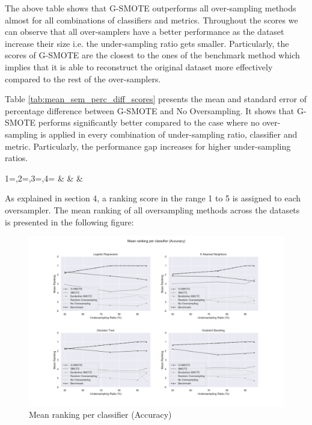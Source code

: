 \documentclass[parskip=full]{scrartcl}
\begin{document}
The above table shows that G-SMOTE outperforms all over-sampling methods almost
for all combinations of classifiers and metrics. Throughout the scores we can
observe that all over-samplers have a better performance as the dataset increase
their size i.e. the under-sampling ratio gets smaller.  Particularly, the scores
of G-SMOTE are the closest to the ones of the benchmark method which implies
that it is able to reconstruct the original dataset more effectively compared to
the rest of the over-samplers.

Table \ref{tab:mean_sem_perc_diff_scores} presents the mean and standard error
of percentage difference between G-SMOTE and No Oversampling. It shows that
G-SMOTE performs significantly better compared to the case where no
over-sampling is applied in every combination of under-sampling ratio,
classifier and metric. Particularly, the performance gap increases for higher
under-sampling ratios.

\begin{center}
	\begin{footnotesize}
		{1=\ratio,2=\classifier,3=\metric,4=\difference}
		{\ratio & \classifier & \metric & \difference}
	\end{footnotesize}
	\addtocounter{table}{-1}
	\label{tab:mean_sem_perc_diff_scores}
\end{center}

As explained in section 4, a ranking score in the range 1 to 5 is assigned to
each oversampler. The mean ranking of all oversampling methods across the
datasets is presented in the following figure: 

\begin{figure}[H]
	\includegraphics[width=1\linewidth]
		{../analysis/mean_ranking_per_classifier_accuracy}
	\caption{Mean ranking per classifier (Accuracy)}
	\label{fig:mean_ranking_per_classifier_accuracy}
\end{figure}
\end{document}
